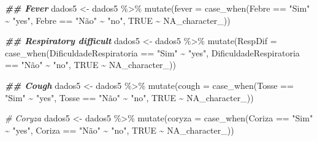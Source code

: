 \documentclass[
]{article}
\newenvironment{Shaded}{\begin{snugshade}}{\end{snugshade}}
\newcommand{\AttributeTok}[1]{\textcolor[rgb]{0.77,0.63,0.00}{#1}}
\newcommand{\CommentTok}[1]{\textcolor[rgb]{0.56,0.35,0.01}{\textit{#1}}}
\newcommand{\ConstantTok}[1]{\textcolor[rgb]{0.00,0.00,0.00}{#1}}
\newcommand{\DocumentationTok}[1]{\textcolor[rgb]{0.56,0.35,0.01}{\textbf{\textit{#1}}}}
\newcommand{\FunctionTok}[1]{\textcolor[rgb]{0.00,0.00,0.00}{#1}}
\newcommand{\NormalTok}[1]{#1}
\newcommand{\OtherTok}[1]{\textcolor[rgb]{0.56,0.35,0.01}{#1}}
\newcommand{\SpecialCharTok}[1]{\textcolor[rgb]{0.00,0.00,0.00}{#1}}
\newcommand{\StringTok}[1]{\textcolor[rgb]{0.31,0.60,0.02}{#1}}
\begin{document}
\begin{Shaded}
\begin{Highlighting}[]
\DocumentationTok{\#\# Fever}
\NormalTok{dados5 }\OtherTok{\textless{}{-}}\NormalTok{  dados5 }\SpecialCharTok{\%\textgreater{}\%}
  \FunctionTok{mutate}\NormalTok{(}\AttributeTok{fever =} \FunctionTok{case\_when}\NormalTok{(Febre }\SpecialCharTok{==} \StringTok{"Sim"} \SpecialCharTok{\textasciitilde{}} \StringTok{"yes"}\NormalTok{,}
\NormalTok{                              Febre }\SpecialCharTok{==} \StringTok{"Não"} \SpecialCharTok{\textasciitilde{}} \StringTok{"no"}\NormalTok{,}
                              \ConstantTok{TRUE} \SpecialCharTok{\textasciitilde{}} \ConstantTok{NA\_character\_}\NormalTok{))}

\DocumentationTok{\#\# Respiratory difficult}
\NormalTok{dados5 }\OtherTok{\textless{}{-}}\NormalTok{  dados5 }\SpecialCharTok{\%\textgreater{}\%}
  \FunctionTok{mutate}\NormalTok{(}\AttributeTok{RespDif =} \FunctionTok{case\_when}\NormalTok{(DificuldadeRespiratoria }\SpecialCharTok{==} \StringTok{"Sim"} \SpecialCharTok{\textasciitilde{}} \StringTok{"yes"}\NormalTok{,}
\NormalTok{                              DificuldadeRespiratoria }\SpecialCharTok{==} \StringTok{"Não"} \SpecialCharTok{\textasciitilde{}} \StringTok{"no"}\NormalTok{,}
                              \ConstantTok{TRUE} \SpecialCharTok{\textasciitilde{}} \ConstantTok{NA\_character\_}\NormalTok{))}

\DocumentationTok{\#\# Cough}
\NormalTok{dados5 }\OtherTok{\textless{}{-}}\NormalTok{  dados5 }\SpecialCharTok{\%\textgreater{}\%}
  \FunctionTok{mutate}\NormalTok{(}\AttributeTok{cough =} \FunctionTok{case\_when}\NormalTok{(Tosse }\SpecialCharTok{==} \StringTok{"Sim"} \SpecialCharTok{\textasciitilde{}} \StringTok{"yes"}\NormalTok{,}
\NormalTok{                              Tosse }\SpecialCharTok{==} \StringTok{"Não"} \SpecialCharTok{\textasciitilde{}} \StringTok{"no"}\NormalTok{,}
                              \ConstantTok{TRUE} \SpecialCharTok{\textasciitilde{}} \ConstantTok{NA\_character\_}\NormalTok{))}

\CommentTok{\# Coryza}
\NormalTok{dados5 }\OtherTok{\textless{}{-}}\NormalTok{  dados5 }\SpecialCharTok{\%\textgreater{}\%}
  \FunctionTok{mutate}\NormalTok{(}\AttributeTok{coryza =} \FunctionTok{case\_when}\NormalTok{(Coriza }\SpecialCharTok{==} \StringTok{"Sim"} \SpecialCharTok{\textasciitilde{}} \StringTok{"yes"}\NormalTok{,}
\NormalTok{                              Coriza }\SpecialCharTok{==} \StringTok{"Não"} \SpecialCharTok{\textasciitilde{}} \StringTok{"no"}\NormalTok{,}
                              \ConstantTok{TRUE} \SpecialCharTok{\textasciitilde{}} \ConstantTok{NA\_character\_}\NormalTok{))}


\end{Highlighting}
\end{Shaded}
\end{document}
